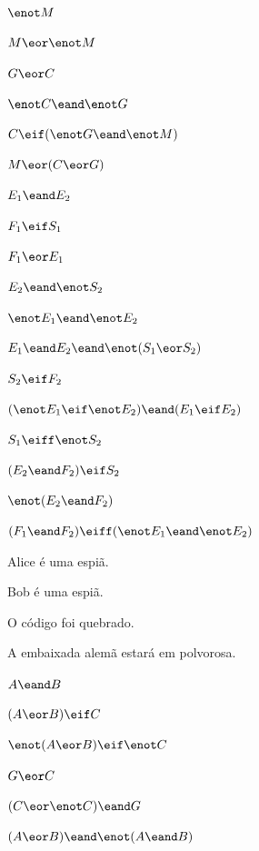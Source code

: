 \begin{earg}
\item $\enot M$
\item $M \eor \enot M$
\item $G \eor C$
\item $\enot C \eand \enot G$
\item $C \eif (\enot G \eand \enot M)$
\item $M \eor (C \eor G)$
\end{earg}


\begin{earg}
\item $E_1 \eand E_2$
\item $F_1 \eif S_1$
\item $F_1 \eor E_1$
\item $E_2 \eand \enot S_2$
\item $\enot E_1 \eand \enot E_2$
\item $E_1 \eand E_2 \eand \enot(S_1 \eor S_2)$
\item $S_2 \eif F_2$
\item $(\enot E_1 \eif \enot E_2) \eand (E_1 \eif E_2)$
\item $S_1 \eiff \enot S_2$
\item $(E_2 \eand F_2) \eif S_2$
\item $\enot(E_2 \eand F_2)$
\item $(F_1 \eand F_2) \eiff (\enot E_1 \eand \enot E_2)$
\end{earg}

\begin{ekey}
\item[A:] Alice é uma espiã.
\item[B:] Bob é uma espiã.
\item[C:] O código foi quebrado.
\item[G:] A embaixada alemã estará em polvorosa.
\end{ekey}
\begin{earg}
\item %
$A \eand B$
\item %
$(A \eor B) \eif C$
\item %
$\enot(A \eor B) \eif \enot C$
\item %
$G \eor C$
\item %
$(C \eor \enot C) \eand G$
\item %
$(A \eor B) \eand \enot(A \eand B)$
\end{earg}


